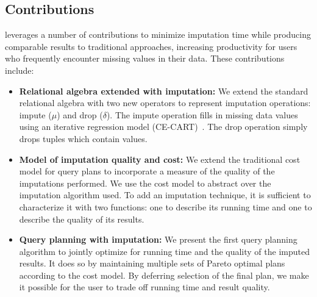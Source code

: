 \subsection{Contributions}
\ProjectName{} leverages a number of contributions to minimize imputation time while producing comparable results to traditional approaches,
increasing productivity for users who frequently encounter missing values in their data. These contributions include:
\begin{itemize}
\item \textbf{Relational algebra extended with imputation:}
  We extend the standard relational algebra with two new operators to represent imputation operations: impute ($\mu$) and drop ($\delta$).
  The impute operation fills in missing data values using an iterative regression model (CE-CART)~\cite{burgette2010multiple}.
  The drop operation simply drops tuples which contain \nullv{} values.
\item \textbf{Model of imputation quality and cost:}
  We extend the traditional cost model for query plans to incorporate a measure of the quality of the imputations performed.
  We use the cost model to abstract over the imputation algorithm used.
  To add an imputation technique, it is sufficient to characterize it with two functions: one to describe its running time and one to describe the quality of its results.
\item \textbf{Query planning with imputation:}
  We present the first query planning algorithm to jointly optimize for running time and the quality of the imputed results.
  It does so by maintaining multiple sets of Pareto optimal plans according to the cost model.
  By deferring selection of the final plan, we make it possible for the user to trade off running time and result quality.
\end{itemize}




